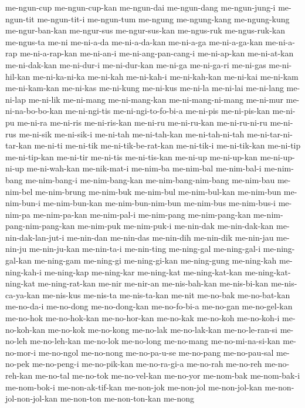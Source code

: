 {me-ngun-cup me-ngun-cup-kan me-ngun-dai me-ngun-dang me-ngun-jung-i
me-ngun-tit me-ngun-tit-i me-ngun-tum me-ngung me-ngung-kang me-ngung-kung
me-ngur-ban-kan me-ngur-sus me-ngur-sus-kan me-ngus-ruk me-ngus-ruk-kan
me-ngus-ta me-ni me-ni-a-da me-ni-a-da-kan me-ni-a-ga me-ni-a-ga-kan
me-ni-a-rap me-ni-a-rap-kan me-ni-an-i me-ni-ang-pan-cang-i me-ni-ap-kan
me-ni-at-kan me-ni-dak-kan me-ni-dur-i me-ni-dur-kan me-ni-ga me-ni-ga-ri
me-ni-gas me-ni-hil-kan me-ni-ka-ni-ka me-ni-kah me-ni-kah-i me-ni-kah-kan
me-ni-kai me-ni-kam me-ni-kam-kan me-ni-kas me-ni-kung me-ni-kus me-ni-la
me-ni-lai me-ni-lang me-ni-lap me-ni-lik me-ni-mang me-ni-mang-kan
me-ni-mang-ni-mang me-ni-mur me-ni-na-bo-bo-kan me-ni-ngi-tis
me-ni-ngi-to-fo-bi-a me-ni-pis me-ni-pis-kan me-ni-pu me-ni-ra me-ni-ris
me-ni-ris-kan me-ni-ru me-ni-ru-kan me-ni-ru-ni-ru me-ni-rus me-ni-sik
me-ni-sik-i me-ni-tah me-ni-tah-kan me-ni-tah-ni-tah me-ni-tar-ni-tar-kan
me-ni-ti me-ni-tik me-ni-tik-be-rat-kan me-ni-tik-i me-ni-tik-kan
me-ni-tip me-ni-tip-kan me-ni-tir me-ni-tis me-ni-tis-kan me-ni-up
me-ni-up-kan me-ni-up-ni-up me-ni-wah-kan me-nik-mat-i me-nim-ba
me-nim-bal me-nim-bal-i me-nim-bang me-nim-bang-i me-nim-bang-kan
me-nim-bang-nim-bang me-nim-bau me-nim-bel me-nim-brung me-nim-buk
me-nim-bul me-nim-bul-kan me-nim-bun me-nim-bun-i me-nim-bun-kan
me-nim-bun-nim-bun me-nim-bus me-nim-bus-i me-nim-pa me-nim-pa-kan
me-nim-pal-i me-nim-pang me-nim-pang-kan me-nim-pang-nim-pang-kan
me-nim-puk me-nim-puk-i me-nin-dak me-nin-dak-kan me-nin-dak-lan-jut-i
me-nin-dan me-nin-das me-nin-dih me-nin-dik me-nin-jau me-nin-ju
me-nin-ju-kan me-nin-ta-i me-nin-ting me-ning-gal me-ning-gal-i
me-ning-gal-kan me-ning-gam me-ning-gi me-ning-gi-kan me-ning-gung
me-ning-kah me-ning-kah-i me-ning-kap me-ning-kar me-ning-kat
me-ning-kat-kan me-ning-kat-ning-kat me-ning-rat-kan me-nir me-nir-an
me-nis-bah-kan me-nis-bi-kan me-nis-ca-ya-kan me-nis-kus me-nis-ta
me-nis-ta-kan me-nit me-no-bak me-no-bat-kan me-no-da-i me-no-dong
me-no-dong-kan me-no-fo-bi-a me-no-gan me-no-gel-kan me-no-hok
me-no-hok-kan me-no-hor-kan me-no-kak me-no-koh me-no-koh-i me-no-koh-kan
me-no-kok me-no-kong me-no-lak me-no-lak-kan me-no-le-ran-si me-no-leh
me-no-leh-kan me-no-lok me-no-long me-no-mang me-no-mi-na-si-kan
me-no-mor-i me-no-ngol me-no-nong me-no-pa-u-se me-no-pang me-no-pau-sal
me-no-pek me-no-peng-i me-no-pik-kan me-no-ra-gi-a me-no-rah me-no-reh
me-no-reh-kan me-no-tal me-no-tok me-no-vel-kan me-no-yor me-nom-bak
me-nom-bak-i me-nom-bok-i me-non-ak-tif-kan me-non-jok me-non-jol
me-non-jol-kan me-non-jol-non-jol-kan me-non-ton me-non-ton-kan me-nong
}
